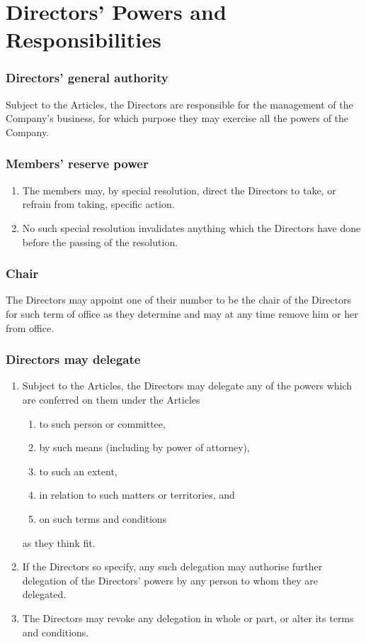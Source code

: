 \documentclass[a4paper,12pt]{article}
\begin{document}
\part{Directors' Powers and Responsibilities}

\section{Directors' general authority}

Subject to the Articles, the Directors are responsible for the management of the Company’s business, for which purpose they may exercise all the powers of the Company.

\section{Members’ reserve power}

\begin{enumerate}
  \item The members may, by special resolution, direct the Directors to take, or refrain from taking, specific action.
  \item No such special resolution invalidates anything which the Directors have done before the passing of the resolution.
\end{enumerate}

\section{Chair}

The Directors may appoint one of their number to be the chair of the Directors for such term of office as they determine and may at any time remove him or her from office.

\section{Directors may delegate}

\begin{enumerate}
  \item Subject to the Articles, the Directors may delegate any of the powers which are conferred on them under the Articles
  \begin{enumerate}
    \item to such person or committee,
    \item by such means (including by power of attorney),
    \item to such an extent,
    \item in relation to such matters or territories, and
    \item on such terms and conditions
  \end{enumerate}
  as they think fit.
  \item If the Directors so specify, any such delegation may authorise further delegation of the Directors’ powers by any person to whom they are delegated.
  \item The Directors may revoke any delegation in whole or part, or alter its terms and conditions.
\end{enumerate}
\end{document}

